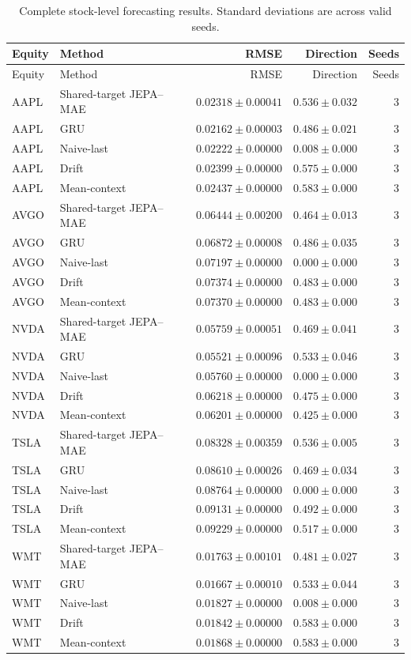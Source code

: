 \begin{longtable}{llrrr}
\caption{Complete stock-level forecasting results. Standard deviations are across valid seeds.}\label{tab:appendix_stock_metrics}\\
\toprule
Equity & Method & RMSE & Direction & Seeds \\
\midrule
\endfirsthead
\toprule
Equity & Method & RMSE & Direction & Seeds \\
\midrule
\endhead
AAPL & Shared-target JEPA--MAE & $0.02318 \pm 0.00041$ & $0.536 \pm 0.032$ & 3 \\
AAPL & GRU & $0.02162 \pm 0.00003$ & $0.486 \pm 0.021$ & 3 \\
AAPL & Naive-last & $0.02222 \pm 0.00000$ & $0.008 \pm 0.000$ & 3 \\
AAPL & Drift & $0.02399 \pm 0.00000$ & $0.575 \pm 0.000$ & 3 \\
AAPL & Mean-context & $0.02437 \pm 0.00000$ & $0.583 \pm 0.000$ & 3 \\
AVGO & Shared-target JEPA--MAE & $0.06444 \pm 0.00200$ & $0.464 \pm 0.013$ & 3 \\
AVGO & GRU & $0.06872 \pm 0.00008$ & $0.486 \pm 0.035$ & 3 \\
AVGO & Naive-last & $0.07197 \pm 0.00000$ & $0.000 \pm 0.000$ & 3 \\
AVGO & Drift & $0.07374 \pm 0.00000$ & $0.483 \pm 0.000$ & 3 \\
AVGO & Mean-context & $0.07370 \pm 0.00000$ & $0.483 \pm 0.000$ & 3 \\
NVDA & Shared-target JEPA--MAE & $0.05759 \pm 0.00051$ & $0.469 \pm 0.041$ & 3 \\
NVDA & GRU & $0.05521 \pm 0.00096$ & $0.533 \pm 0.046$ & 3 \\
NVDA & Naive-last & $0.05760 \pm 0.00000$ & $0.000 \pm 0.000$ & 3 \\
NVDA & Drift & $0.06218 \pm 0.00000$ & $0.475 \pm 0.000$ & 3 \\
NVDA & Mean-context & $0.06201 \pm 0.00000$ & $0.425 \pm 0.000$ & 3 \\
TSLA & Shared-target JEPA--MAE & $0.08328 \pm 0.00359$ & $0.536 \pm 0.005$ & 3 \\
TSLA & GRU & $0.08610 \pm 0.00026$ & $0.469 \pm 0.034$ & 3 \\
TSLA & Naive-last & $0.08764 \pm 0.00000$ & $0.000 \pm 0.000$ & 3 \\
TSLA & Drift & $0.09131 \pm 0.00000$ & $0.492 \pm 0.000$ & 3 \\
TSLA & Mean-context & $0.09229 \pm 0.00000$ & $0.517 \pm 0.000$ & 3 \\
WMT & Shared-target JEPA--MAE & $0.01763 \pm 0.00101$ & $0.481 \pm 0.027$ & 3 \\
WMT & GRU & $0.01667 \pm 0.00010$ & $0.533 \pm 0.044$ & 3 \\
WMT & Naive-last & $0.01827 \pm 0.00000$ & $0.008 \pm 0.000$ & 3 \\
WMT & Drift & $0.01842 \pm 0.00000$ & $0.583 \pm 0.000$ & 3 \\
WMT & Mean-context & $0.01868 \pm 0.00000$ & $0.583 \pm 0.000$ & 3 \\
\bottomrule
\end{longtable}
